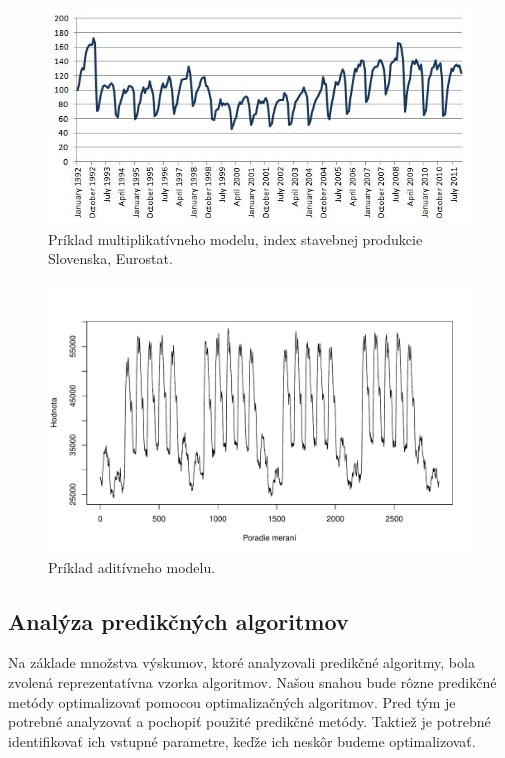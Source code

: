 \documentclass[a4paper,slovak,12pt,appendix]{article}
\begin{document}
\begin{figure}[!ht]
  \centering
	\captionsetup{justification=centering}
  \includegraphics[width=\textwidth]{multi_model.jpg}
  \caption[Príklad multiplikatívneho modelu.]{Príklad multiplikatívneho modelu, index stavebnej produkcie Slovenska, Eurostat.}
  \label{fig-multi-model}
\end{figure}

\begin{figure}[!ht]
  \centering
  \includegraphics[width=\textwidth]{add_model.pdf}
  \caption{Príklad aditívneho modelu.}
  \label{fig-add-model}
\end{figure}


\subsection{Analýza predikčných algoritmov}
Na základe množstva výskumov, ktoré analyzovali predikčné algoritmy, bola
zvolená reprezentatívna vzorka algoritmov. Našou snahou bude rôzne predikčné
metódy optimalizovať pomocou optimalizačných algoritmov. Pred tým je potrebné
analyzovať a pochopiť použité predikčné metódy. Taktiež je potrebné
identifikovať ich vstupné parametre, keďže ich neskôr budeme optimalizovať.
\end{document}
